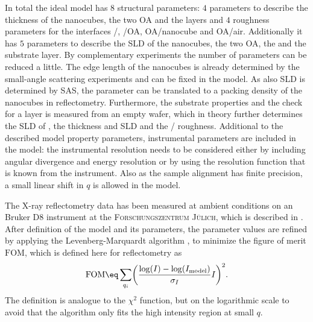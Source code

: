 \documentclass[\main/dresen_thesis.tex]{subfiles}
\begin{document}
  In total the ideal model has $8$ structural parameters: $4$ parameters to describe the thickness of the nanocubes, the two OA and the  layers and $4$ roughness parameters for the interfaces /, /OA, OA/nanocube and OA/air.
  Additionally it has $5$ parameters to describe the SLD of the nanocubes, the two OA, the  and the substrate layer.
  By complementary experiments the number of parameters can be reduced a little.
  The edge length of the nanocubes is already determined by the small-angle scattering experiments and can be fixed in the model.
  As also SLD is determined by SAS, the parameter can be translated to a packing density of the nanocubes in reflectometry.
  Furthermore, the substrate properties and the check for a  layer is measured from an empty wafer, which in theory further determines the SLD of , the  thickness and SLD and the / roughness.
  Additional to the described model property parameters, instrumental parameters are included in the model: the instrumental resolution needs to be considered either by including angular divergence and energy resolution or by using the resolution function that is known from the instrument.
  Also as the sample alignment has finite precision, a small linear shift in $q$ is allowed in the model.

  The X-ray reflectometry data has been measured at ambient conditions on an Bruker D8 instrument at the \textsc{Forschungszentrum J\"ulich}, which is described in .
  After definition of the model and its parameters, the parameter values are refined by applying the Levenberg-Marquardt algorithm \cite{Marquardt_1963_Analgo}, to minimize the figure of merit $\mathrm{FOM}$, which is defined here for reflectometry as
  \begin{align}
    \mathrm{FOM} \eq \sum_{q_i} \biggl( \frac{\log(I) - \log(I_\mathrm{model})}{\sigma_{I}} I\biggr)^2.
  \end{align}
  The definition is analogue to the $\chi^2$ function, but on the logarithmic scale to avoid that the algorithm only fits the high intensity region at small $q$.
\end{document}
